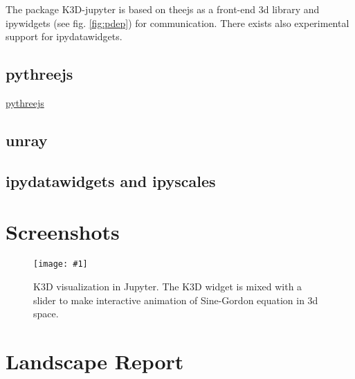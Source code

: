 \documentclass{deliverablereport}
\begin{document}
The package K3D-jupyter is based on theejs as a front-end 3d library
and ipywidgets (see fig. \ref{fig:pdep}) for communication.  There exists also
experimental support for ipydatawidgets. 



\subsection{pythreejs}

\href{https://github.com/jupyter-widgets/pythreejs}{pythreejs}

\subsection{unray}

\subsection{ipydatawidgets and ipyscales}




\appendix
\section{Screenshots}\label{screenshots}

\newcommand{\screenshot}[2]{
\begin{figure}[ht]
  \texttt{[image: \#1]}
  \caption{#2}
\end{figure}}


\screenshot{k3d_3.png}{K3D visualization in Jupyter. The K3D widget is
  mixed with a slider to make interactive animation of Sine-Gordon
  equation in 3d space.}

\clearpage
\section{Landscape Report}\label{landscape}

\end{document}
